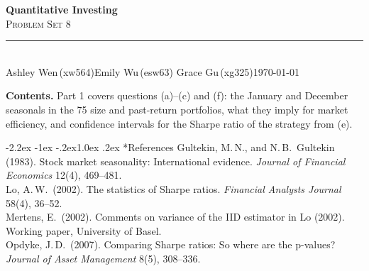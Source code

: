 \documentclass[11pt]{article}
\makeatletter
\renewcommand\subsection{\@startsection{subsection}{2}{0pt}%
  {-2.2ex \@plus -1ex \@minus -.2ex}{1.0ex \@plus .2ex}%
  {\normalfont\bfseries\normalsize\color{psink}}}
\makeatother
\begin{document}
\thispagestyle{empty}
\begin{flushleft}
{\bfseries\LARGE\color{psink} Quantitative Investing}\\[3pt]
{\scshape\Large\color{psink} Problem Set 8}\\[10pt]
{\color{psrule}\rule{\textwidth}{1.2pt}}\\[5pt]
{\small Ashley Wen\,(xw564)\quad\textbar\quad Emily Wu\,(esw63)%
\quad\textbar\quad Grace Gu\,(xg325)\hfill \today}
\end{flushleft}

\vspace{1.4em}

{\color{psink}\textbf{Contents.}} Part 1 covers questions (a)--(c) and (f): the January and
December seasonals in the 75 size and past-return portfolios, what they imply for market
efficiency, and confidence intervals for the Sharpe ratio of the strategy from (e).

\vspace{0.8em}




\subsection*{References}
{\small Gultekin, M.\,N., and N.\,B.\ Gultekin (1983). Stock market seasonality: International
evidence. \textit{Journal of Financial Economics} 12(4), 469--481.\\[2pt]
Lo, A.\,W.\ (2002). The statistics of Sharpe ratios. \textit{Financial Analysts Journal}
58(4), 36--52.\\[2pt]
Mertens, E.\ (2002). Comments on variance of the IID estimator in Lo (2002). Working paper,
University of Basel.\\[2pt]
Opdyke, J.\,D.\ (2007). Comparing Sharpe ratios: So where are the p-values?
\textit{Journal of Asset Management} 8(5), 308--336.}
\end{document}
